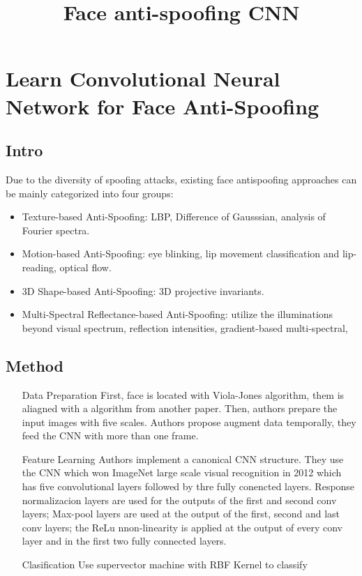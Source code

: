 \documentclass[a4paper]{article}
\begin{document}
\title{Face anti-spoofing CNN}
\maketitle

\section{Learn Convolutional Neural Network for Face Anti-Spoofing}

\subsection{Intro}
Due to the diversity of spoofing attacks, existing face antispoofing approaches can be mainly categorized into four groups:

\begin{itemize}
\item Texture-based Anti-Spoofing: LBP, Difference of Gausssian, analysis of Fourier spectra.
\item Motion-based Anti-Spoofing: eye blinking, lip movement classification and lip-reading, optical flow.
\item 3D Shape-based Anti-Spoofing: 3D projective invariants.
\item Multi-Spectral Reflectance-based Anti-Spoofing: utilize the illuminations beyond visual spectrum, reflection intensities, gradient-based multi-spectral, 
\end{itemize}

\subsection{Method}
\begin{itemize} 
\item[Data Preparation] First, face is located with Viola-Jones algorithm, them is aliagned with a algorithm from another paper. Then, authors prepare the input images with five scales. Authors propose augment data temporally, they feed the CNN with more than one frame. 
\item[Feature Learning] Authors implement a canonical CNN structure. They use the CNN which won ImageNet large scale visual recognition in 2012 which has five convolutional layers followed by thre fully conencted layers. Response normalizacion layers are used for the outputs of the first and second conv layers; Max-pool layers are used at the output of the first, second and last conv layers; the ReLu nnon-linearity is applied at the output of every conv layer and in the first two fully connected layers.
\item[Clasification] Use supervector machine with RBF Kernel to classify
\end{itemize}
\end{document}
